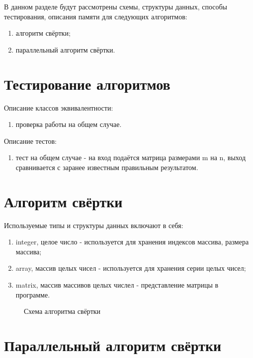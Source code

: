 В данном разделе будут рассмотрены схемы, структуры данных, способы тестирования, описания памяти для следующих алгоритмов:
\begin{enumerate}
	\item алгоритм свёртки;
	\item параллельный алгоритм свёртки.
\end{enumerate}

\section{Тестирование алгоритмов}

Описание классов эквивалентности:
\begin{enumerate}
	\item проверка работы на общем случае.
\end{enumerate}

Описание тестов:
\begin{enumerate}
	\item тест на общем случае - на вход подаётся матрица размерами m на n, выход сравнивается с заранее известным правильным результатом.
\end{enumerate}

\section{Алгоритм свёртки}

Используемые типы и структуры данных включают в себя:
\begin{enumerate}
	\item integer, целое число - используется для хранения индексов массива, размера массива;
	\item array, массив целых чисел - используется для хранения серии целых чисел;
	\item matrix, массив массивов целых числел - представление матрицы в программе.
\end{enumerate}

\newpage

\begin{figure}[ph!]
	\caption{Схема алгоритма свёртки}
\end{figure}

\section{Параллельный алгоритм свёртки}

